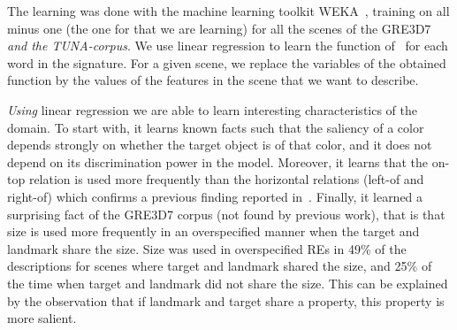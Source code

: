 The learning was done with the machine learning toolkit WEKA~\cite{Hall:WEK09}, training on all minus one 
(the one for that we are learning) for all the scenes of the GRE3D7 \textit{and the TUNA-corpus}. 
We use linear regression to learn the function of \puse\ for each word in the signature.
For a given scene, we replace the variables of the obtained function by the values of the features in the scene 
that we want to describe.

\textit{Using} linear regression we are able to learn interesting characteristics of the domain. To start with, it learns known facts such that the 
saliency of a color depends strongly on whether the target object is of that color, and it does not depend on its discrimination power 
in the model. Moreover, it learns that the on-top relation is used more frequently than the horizontal relations (left-of and right-of) 
which confirms a previous finding reported in~\cite{viet:gene11}. Finally, it learned a surprising fact of the GRE3D7 corpus
 (not found by previous work), that is that size is used more frequently in an overspecified manner when the target and landmark share the
 size. Size was used in overspecified REs in 49\% of the descriptions for scenes where target and landmark shared the size, and 25\% 
of the time when target and landmark did not share the size. This can be explained by the observation that if landmark and target share a
 property, this property is more salient. 

